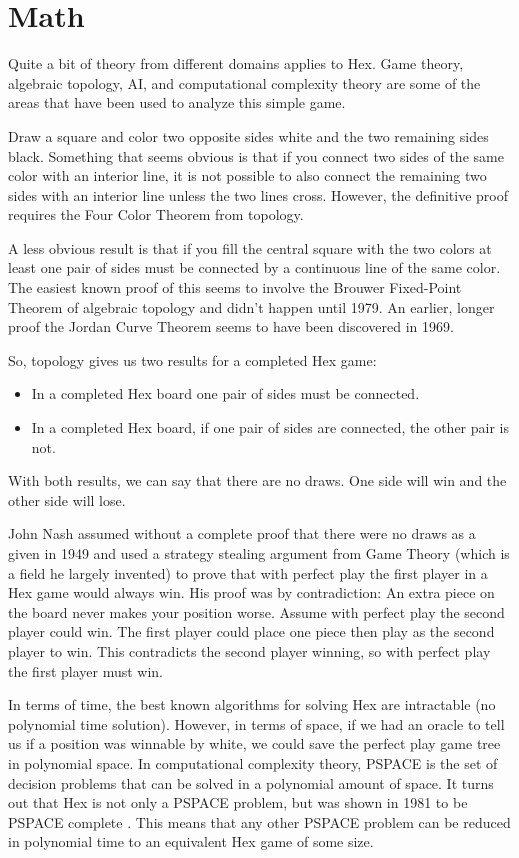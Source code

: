 \documentclass[12pt,titlepage]{amsart}
\begin{document}
\section{Math}

Quite a bit of theory from different domains applies to Hex. Game theory,
algebraic topology, AI, and computational complexity theory are some of the
areas that have been used to analyze this simple game.

Draw a square and color two opposite sides white and the two remaining sides
black. Something that seems obvious is that if you connect two sides of the same
color with an interior line, it is not possible to also connect the remaining
two sides with an interior line unless the two lines cross.  However, the
definitive proof requires the Four Color Theorem from topology.

A less obvious result is that if you fill the central square with the two colors
at least one pair of sides must be connected by a continuous line of the same
color. The easiest known proof of this seems to involve the Brouwer Fixed-Point
Theorem of algebraic topology \cite{Gale:1980} and didn't happen until 1979. An
earlier, longer proof the Jordan Curve Theorem seems to have been discovered in
1969.

So, topology gives us two results for a completed Hex game:
\begin{itemize}
\item In a completed Hex board one pair of sides must be connected.

\item In a completed Hex board, if one pair of sides are connected, the other
pair is not.
\end{itemize}

With both results, we can say that there are no draws. One side will win and the
other side will lose.

John Nash assumed without a complete proof that there were no draws as a given
in 1949 and used a strategy stealing argument from Game Theory (which is a field
he largely invented) to prove that with perfect play the first player in a Hex
game would always win.  His proof was by contradiction: An extra piece on the
board never makes your position worse. Assume with perfect play the second
player could win. The first player could place one piece then play as the second
player to win. This contradicts the second player winning, so with perfect play
the first player must win.

In terms of time, the best known algorithms for solving Hex are intractable (no
polynomial time solution). However, in terms of space, if we had an oracle to
tell us if a position was winnable by white, we could save the perfect play game
tree in polynomial space.  In computational complexity theory, PSPACE is the set
of decision problems that can be solved in a polynomial amount of space. It
turns out that Hex is not only a PSPACE problem, but was shown in 1981 to be
PSPACE complete \cite{Reisch1981}. This means that any other PSPACE problem can
be reduced in polynomial time to an equivalent Hex game of some size.
\end{document}
